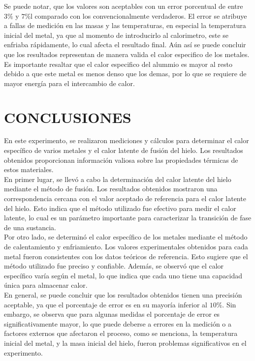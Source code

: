 \documentclass[10pt]{article}
\begin{document}
\begin{multicols*}{2}
    Se puede notar, que los valores son aceptables con un error porcentual de entre
    $3\%$ y $ 7\%$l comparado con los convencionalmente verdaderos. El error se
    atribuye a fallas de medición en las masas y las temperaturas, en especial la
    temperatura inicial del metal, ya que al momento de introducirlo al
    calorimetro, este se enfriaba rápidamente, lo cual afecta el resultado final.
    Aún así se puede concluir que los resultados representan de manera valida el
    calor especifico de los metales. Es importante resaltar que el calor especifico
    del alummio es mayor al resto debido a que este metal es menos denso que los
    demas, por lo que se requiere de mayor energía para el intercambio de calor.

    \section{\small CONCLUSIONES}
    En este experimento, se realizaron mediciones y cálculos para determinar el
    calor específico de varios metales y el calor latente de fusión del hielo. Los
    resultados obtenidos proporcionan información valiosa sobre las propiedades
    térmicas de estos materiales.\\

    En primer lugar, se llevó a cabo la determinación del calor latente del hielo
    mediante el método de fusión. Los resultados obtenidos mostraron una
    correspondencia cercana con el valor aceptado de referencia para el calor
    latente del hielo. Esto indica que el método utilizado fue efectivo para medir
    el calor latente, lo cual es un parámetro importante para caracterizar la
    transición de fase de una sustancia.\\

    Por otro lado, se determinó el calor específico de los metales mediante el
    método de calentamiento y enfriamiento. Los valores experimentales obtenidos
    para cada metal fueron consistentes con los datos teóricos de referencia. Esto
    sugiere que el método utilizado fue preciso y confiable. Además, se observó que
    el calor específico varía según el metal, lo que indica que cada uno tiene una
    capacidad única para almacenar calor.\\

    En general, se puede concluir que los resultados obtenidos tienen una precisión
    aceptable, ya que el porcentaje de error es en su mayoría inferior al $10 \%$.
    Sin embargo, se observa que para algunas medidas el porcentaje de error es
    significativamente mayor, lo que puede deberse a errores en la medición o a
    factores externos que afectaron el proceso, como se menciona, la temperatura
    inicial del metal, y la masa inicial del hielo, fueron problemas significativos
    en el experimento.\\

    \nocite{giancoli}
    \nocite{montiel2015física}

    
    
\end{multicols*}
\end{document}
